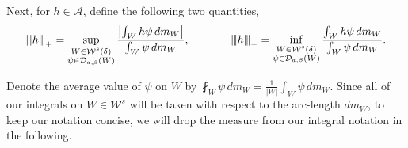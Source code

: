 \documentclass{amsart}
\numberwithin{equation}{section}
\newcommand\cA{{\mathcal A}}
\newcommand\cD{{\mathcal D}}
\newcommand\cW{{\mathcal W}}
\newcommand{\tri}{{|\:\!\!|\:\!\!|}}
\begin{document}
Next, for $h \in \cA$, define the following two quantities,
\begin{equation}
\label{eq:tri def}
\tri h \tri_+ = \sup_{\stackrel{\scriptstyle W \in \cW^s(\delta)}{\psi \in \cD_{a,\beta}(W)}} \frac{\left|\int_W h \psi \, dm_W\right|}{\int_W \psi \, dm_W} ,
\hskip1.3cm
\tri h \tri_- = \inf_{\stackrel{\scriptstyle W \in \cW^s(\delta)}{\psi \in \cD_{a,\beta}(W)}} \frac{\int_W h \psi \, dm_W}{\int_W \psi \, dm_W} .
\end{equation}


Denote the average value of 
$\psi$ on $W$ by $\fint_W \psi\, dm_W=\frac{1}{|W|}\int_W \psi \, dm_W$.  
Since all of our integrals on $W \in \cW^s$
will be taken with respect to the arc-length $dm_W$, to keep our notation concise, we will drop the measure from our 
integral notation in the following.
\end{document}
